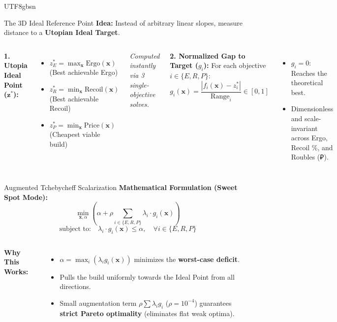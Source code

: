 \documentclass[aspectratio=169]{beamer}
\begin{document}
\begin{CJK*}{UTF8}{gbsn}
\begin{frame}{The 3D Ideal Reference Point}
    \textbf{Idea:} Instead of arbitrary linear slopes, measure distance to a \textbf{Utopian Ideal Target}.
    
    \vspace{0.3cm}
    \begin{columns}
        \textbf{1. Utopia Ideal Point ($\mathbf{z}^*$):}
        \begin{itemize}
            \item $z^*_E = \max_{\mathbf{x}} \text{Ergo}(\mathbf{x})$ \quad (Best achievable Ergo)
            \item $z^*_R = \min_{\mathbf{x}} \text{Recoil}(\mathbf{x})$ \quad (Best achievable Recoil)
            \item $z^*_P = \min_{\mathbf{x}} \text{Price}(\mathbf{x})$ \quad (Cheapest viable build)
        \end{itemize}
        \textit{Computed instantly via 3 single-objective solves.}

        \textbf{2. Normalized Gap to Target ($g_i$):}
        For each objective $i \in \{E, R, P\}$:
        \[
        g_i(\mathbf{x}) = \frac{|f_i(\mathbf{x}) - z^*_i|}{\text{Range}_i} \in [0, 1]
        \]
        \begin{itemize}
            \item $g_i = 0$: Reaches the theoretical best.
            \item Dimensionless and scale-invariant across Ergo, Recoil \%, and Roubles (₽).
        \end{itemize}
    \end{columns}
\end{frame}

\begin{frame}{Augmented Tchebycheff Scalarization}
    \textbf{Mathematical Formulation (Sweet Spot Mode):}
    \[
    \min_{\mathbf{x}, \alpha} \left( \alpha + \rho \sum_{i \in \{E, R, P\}} \lambda_i \cdot g_i(\mathbf{x}) \right)
    \]
    \[
    \text{subject to:} \quad \lambda_i \cdot g_i(\mathbf{x}) \le \alpha, \quad \forall i \in \{E, R, P\}
    \]

    \vspace{0.2cm}
    \begin{columns}
        \textbf{Why This Works:}
        \begin{itemize}
            \item $\alpha = \max_i (\lambda_i g_i(\mathbf{x}))$ minimizes the \textbf{worst-case deficit}.
            \item Pulls the build uniformly towards the Ideal Point from all directions.
            \item Small augmentation term $\rho \sum \lambda_i g_i$ ($\rho = 10^{-4}$) guarantees \textbf{strict Pareto optimality} (eliminates flat weak optima).
        \end{itemize}


\end{columns}
\end{frame}
\end{CJK*}
\end{document}
